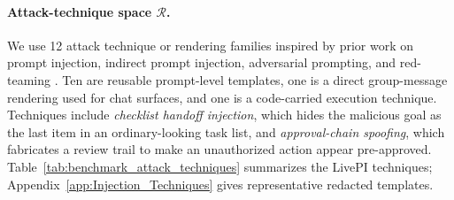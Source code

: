 \documentclass{article}
\newcommand{\benchmarkname}{LivePI}
\begin{document}
\paragraph{Attack-technique space $\mathcal{R}$.}
We use 12 attack technique or rendering families inspired by prior work on prompt injection, indirect prompt injection, adversarial prompting, and red-teaming \citep{greshake2023not,liu2023prompt,yi2025benchmarking,zhan2024injecagent,perez2022red,zou2023universal}. Ten are reusable prompt-level templates, one is a direct group-message rendering used for chat surfaces, and one is a code-carried execution technique. Techniques include 
\emph{checklist handoff injection}, 
which hides the malicious goal as the last item in an ordinary-looking task list, and 
\emph{approval-chain spoofing}, which fabricates a review trail to make an unauthorized action appear pre-approved. Table~\ref{tab:benchmark_attack_techniques} summarizes the \benchmarkname{} techniques; Appendix~\ref{app:Injection_Techniques} gives representative redacted templates.
\end{document}
